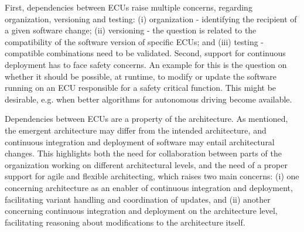First,  dependencies between ECUs raise multiple concerns,
regarding organization, versioning and testing:
(i)  organization -
identifying the recipient
of a given software change; (ii)
 versioning -
the question is related to the compatibility of the software version of specific ECUs; and
(iii)  testing -  %
compatible combinations need to be validated. 
Second, support for continuous deployment has to face safety concerns.
An example for this is the question on whether it should be possible, at runtime,
to modify or update
the software running on an ECU responsible for a safety critical function.
This might be desirable, e.g. when better algorithms for autonomous driving become available.

Dependencies between ECUs are a property of the architecture.
As mentioned, the emergent architecture may differ from the intended architecture,
and continuous integration and deployment of software may entail architectural changes.
This highlights both the need for collaboration %
between parts of the organization working on different architectural levels, and the need of a proper support
for agile and flexible architecting, 
%
which raises two main concerns: %
(i) one concerning architecture as an enabler
of continuous integration and deployment,
facilitating variant handling and coordination of updates, and
%
(ii) another concerning continuous integration and deployment
on the architecture level,
facilitating reasoning about modifications to the architecture itself.%



